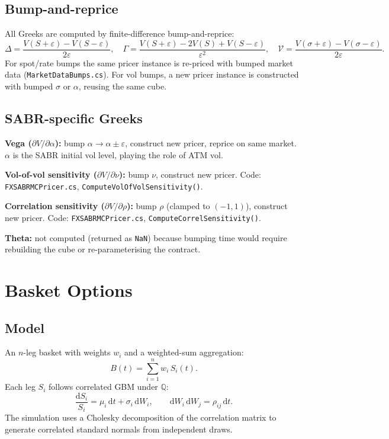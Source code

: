 \documentclass[11pt,a4paper]{article}
\newcommand{\dd}{\mathrm{d}}
\newcommand{\Q}{\mathbb{Q}}
\newcommand{\coderef}[1]{\texttt{\color{blue!60!black}#1}}
\theoremstyle{definition}
\begin{document}
\subsection{Bump-and-reprice}

All Greeks are computed by finite-difference bump-and-reprice:
\[
  \Delta = \frac{V(S+\varepsilon)-V(S-\varepsilon)}{2\varepsilon},
  \quad
  \Gamma = \frac{V(S+\varepsilon)-2V(S)+V(S-\varepsilon)}{\varepsilon^2},
  \quad
  \mathcal{V} = \frac{V(\sigma+\varepsilon)-V(\sigma-\varepsilon)}{2\varepsilon}.
\]
For spot/rate bumps the same pricer instance is re-priced with bumped market
data (\coderef{MarketDataBumps.cs}).  For vol bumps, a new pricer instance
is constructed with bumped $\sigma$ or $\alpha$, reusing the same cube.

\subsection{SABR-specific Greeks}

\textbf{Vega ($\partial V/\partial\alpha$):} bump $\alpha\to\alpha\pm\varepsilon$,
construct new pricer, reprice on same market.  $\alpha$ is the SABR initial
vol level, playing the role of ATM vol.

\textbf{Vol-of-vol sensitivity ($\partial V/\partial\nu$):} bump $\nu$,
construct new pricer.  Code: \coderef{FXSABRMCPricer.cs},
\texttt{ComputeVolOfVolSensitivity()}.

\textbf{Correlation sensitivity ($\partial V/\partial\rho$):} bump $\rho$
(clamped to $(-1,1)$), construct new pricer.  Code:
\coderef{FXSABRMCPricer.cs}, \texttt{ComputeCorrelSensitivity()}.

\textbf{Theta:} not computed (returned as \texttt{NaN}) because bumping time
would require rebuilding the cube or re-parameterising the contract.

\section{Basket Options}
\label{sec:basket}

\subsection{Model}

An $n$-leg basket with weights $w_i$ and a weighted-sum aggregation:
\[
  B(t) = \sum_{i=1}^n w_i\,S_i(t).
\]
Each leg $S_i$ follows correlated GBM under $\Q$:
\[
  \frac{\dd S_i}{S_i} = \mu_i\,\dd t + \sigma_i\,\dd W_i,
  \qquad \dd W_i\,\dd W_j = \rho_{ij}\,\dd t.
\]
The simulation uses a Cholesky decomposition of the correlation matrix to
generate correlated standard normals from independent draws.
\end{document}
